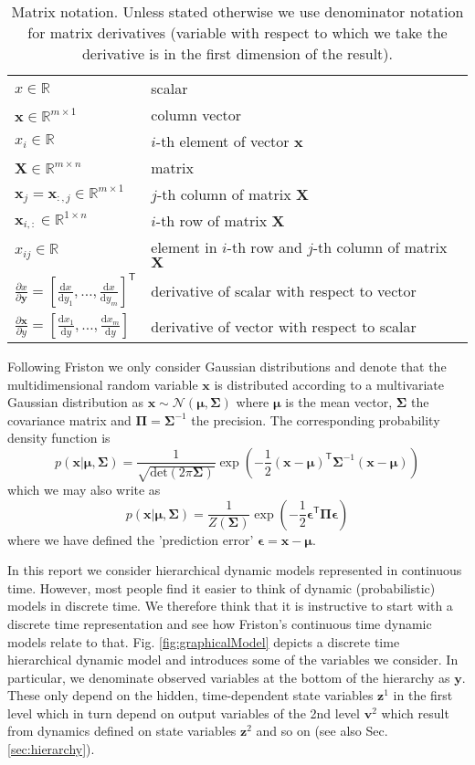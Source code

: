 \documentclass[a4paper,10pt]{article}
\newcommand{\bs}[1]{\mathbf{#1}}					%
\newcommand{\bgs}[1]{\boldsymbol{#1}}				%
\newcommand{\ud}{\mathrm{d}}					%
\newcommand{\pd}[2]{\frac{\partial #1}{\partial #2}} 	%
\newcommand{\tr}{\mathsf{T}}				%
\newcommand{\eq}[1]{\begin{equation} #1 \end{equation}}%
\renewcommand{\ss}{z}         %
\newcommand{\sv}{v}         %
\newcommand{\so}{y}         %
\newcommand{\spe}{\epsilon} %
\newcommand{\spm}{\mu}    %
\newcommand{\ps}{\bs{\ss}}    %
\newcommand{\pv}{\bs{\sv}}    %
\newcommand{\po}{\bs{\so}}    %
\newcommand{\ppe}{\bgs{\spe}} %
\newcommand{\ppm}{\bgs{\spm}}   %
\newcommand{\N}{\mathcal{N}}			%
\newcommand{\R}{\mathbb{R}}				%
\newcommand{\Cov}{\bgs{\Sigma}}			%
\newcommand{\Prec}{\bgs{\Pi}}			%
\renewcommand{\det}[1]{\mathrm{det}(#1)}	%
\begin{document}
\begin{table}
\begin{tabular}{ll}
$x \in \R$ & scalar\\
$\bs{x} \in \R^{m\times 1}$ & column vector\\
$x_i \in \R$ & $i$-th element of vector $\bs{x}$\\
$\bs{X} \in \R^{m\times n}$ & matrix\\
$\bs{x}_j = \bs{x}_{:,j} \in \R^{m\times 1}$ & $j$-th column of matrix $\bs{X}$\\
$\bs{x}_{i,:} \in \R^{1\times n}$ & $i$-th row of matrix $\bs{X}$\\
$x_{ij}\in \R$ & element in $i$-th row and $j$-th column of matrix $\bs{X}$\\
$\pd{x}{\bs{y}} = [\frac{\ud x}{\ud y_1}, \dots, \frac{\ud x}{\ud y_m}]^\tr$ & derivative of scalar with respect to vector\\
$\pd{\bs{x}}{y} = [\frac{\ud x_1}{\ud y}, \dots, \frac{\ud x_m}{\ud y}]$ & derivative of vector with respect to scalar\\
\end{tabular}
\caption{Matrix notation. Unless stated otherwise we use denominator notation for matrix derivatives (variable with respect to which we take the derivative is in the first dimension of the result).}
\label{tab:matrixnot}
\end{table}

Following Friston we only consider Gaussian distributions and denote that the multidimensional random variable $\bs{x}$ is distributed according to a multivariate Gaussian distribution as $\bs{x} \sim \N(\ppm, \Cov)$ where $\ppm$ is the mean vector, $\Cov$ the covariance matrix and $\Prec = \Cov^{-1}$ the precision. The corresponding probability density function is
\eq{
    p(\bs{x}|\ppm,\Cov) = \frac{1}{\sqrt{\det{2\pi \Cov}}}\exp\left( -\frac{1}{2}(\bs{x} - \ppm)^\tr\Cov^{-1} (\bs{x} - \ppm) \right)
}
which we may also write as
\eq{
    p(\bs{x}|\ppm,\Cov) = \frac{1}{Z(\Cov)}\exp\left( -\frac{1}{2}\ppe^\tr\Prec \ppe \right)
}
where we have defined the 'prediction error' $\ppe = \bs{x} - \ppm$.

In this report we consider hierarchical dynamic models represented in continuous time. However, most people find it easier to think of dynamic (probabilistic) models in discrete time. We therefore think that it is instructive to start with a discrete time representation and see how Friston's continuous time dynamic models relate to that. Fig. \ref{fig:graphicalModel} depicts a discrete time hierarchical dynamic model and introduces some of the variables we consider. In particular, we denominate observed variables at the bottom of the hierarchy as $\po$. These only depend on the hidden, time-dependent state variables $\ps^1$ in the first level which in turn depend on output variables of the 2nd level $\pv^2$ which result from dynamics defined on state variables $\ps^2$ and so on (see also Sec. \ref{sec:hierarchy}).
\end{document}
